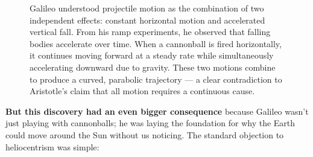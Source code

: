 \begin{figure}[H]
\centering
{}

\vspace{0.5em}
\caption{\small Galileo understood projectile motion as the combination of two independent effects: constant horizontal motion and accelerated vertical fall. From his ramp experiments, he observed that falling bodies accelerate over time. When a cannonball is fired horizontally, it continues moving forward at a steady rate while simultaneously accelerating downward due to gravity. These two motions combine to produce a curved, parabolic trajectory — a clear contradiction to Aristotle’s claim that all motion requires a continuous cause.}
\end{figure}


\textbf{But this discovery had an even bigger consequence} because Galileo wasn’t just playing with cannonballs; he was laying the foundation for why the Earth could move around the Sun without us noticing. The standard objection to heliocentrism was simple: 

